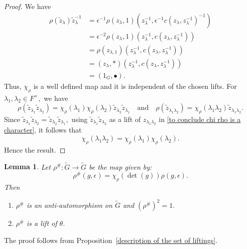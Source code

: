 \documentclass[11pt, a4paper, reqno]{amsart}
\newtheorem{lemma}[theorem]{Lemma}
\theoremstyle{definition}
\theoremstyle{remark}
\theoremstyle{example}
\theoremstyle{note}
\numberwithin{equation}{section}
\begin{document}
\begin{proof}  We have 
\begin{align*}
\rho(\tilde{z}_{\lambda})\tilde{z}_{\lambda}^{-1} &= \epsilon^{-1}\rho(z_{\lambda}, 1)(z_{\lambda}^{-1}, \epsilon^{-1}c(z_{\lambda}, z_{\lambda}^{-1})^{-1})\\
&= \epsilon^{-2}\rho(z_{\lambda}, 1)(z_{\lambda}^{-1}, c(z_{\lambda}, z_{\lambda}^{-1}))\\
&= \rho(z_{\lambda, 1})(z_{\lambda}^{-1}, c(z_{\lambda}, z_{\lambda}^{-1}))\\
&= (z_{\lambda}, *)(z_{\lambda}^{-1}, c(z_{\lambda}, z_{\lambda}^{-1}))\\
&=(1_{G}, \bullet).
\end{align*}
Thus, $\chi_{\rho}$ is a well defined map and it is independent of the chosen lifts. For $\lambda_{1}, \lambda_{2} \in F^{\times},$ we have 
\begin{equation}\label{to conclude chi rho is a character}
\rho(\tilde{z}_{{\lambda}_{1}} \tilde{z}_{{\lambda}_{2}}) = \chi_{\rho}(\lambda_{1}) \chi_{\rho}(\lambda_{2}) \tilde{z}_{{\lambda}_{2}} \tilde{z}_{{\lambda}_{1}}\quad \text{and} \quad \rho(\tilde{z}_{{\lambda}_{1} {\lambda}_{2}}) = \chi_{\rho}(\lambda_{1} \lambda_{2}) \tilde{z}_{{\lambda}_{1} {\lambda}_{2}}.
\end{equation}
Since $ \tilde{z}_{{\lambda}_{1}} \tilde{z}_{{\lambda}_{2}} = \tilde{z}_{{\lambda}_{2}} \tilde{z}_{{\lambda}_{1}},$ using $\tilde{z}_{{\lambda}_{1}} \tilde{z}_{{\lambda}_{2}}$ as a lift of $z_{{\lambda}_{1} {\lambda}_{2}}$ in \eqref{to conclude chi rho is a character}, it follows that 
$$\chi_{\rho}(\lambda_{1} \lambda_{2}) = \chi_{\rho}(\lambda_{1})\chi_{\rho}(\lambda_{2}).$$ Hence the result.
\end{proof}

\begin{lemma}\label{definition of rhohash} Let $\rho^{\#}: \widetilde{G} \to \widetilde{G}$ be the map given by:
\begin{equation}\label{definition of rho sharp}
\rho^{\#}(g, \epsilon) = \chi_{\rho}(\det(g))\rho(g, \epsilon).
\end{equation}
Then 
\begin{enumerate}[label=\emph{\arabic*)}]
\item $\rho^{\#}$ is an anti-automorphism on $\widetilde{G}$ and $(\rho^{\#})^2 =1.$
\smallskip

\item $\rho^{\#}$ is a lift of $\theta$.
\end{enumerate}
\end{lemma}
The proof follows from Proposition~\ref{description of the set of liftings}.
\end{document}
